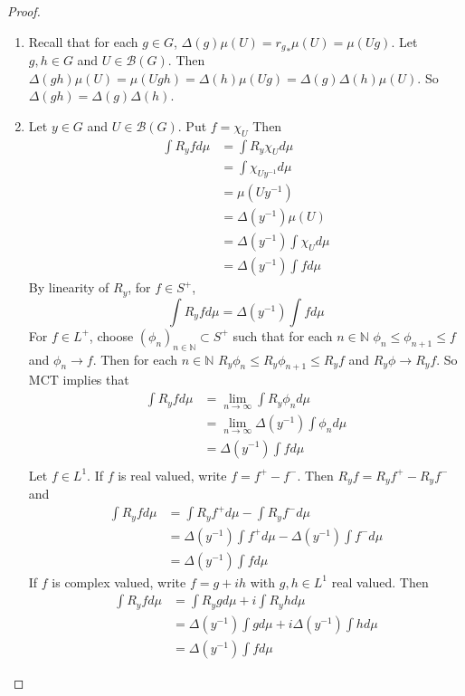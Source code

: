 \documentclass[12pt]{amsart}
\theoremstyle{definition}
\newcommand{\Del}{\Delta}
\newcommand{\N}{\mathbb{N}}
\newcommand{\MB}{\mathcal{B}}
\newcommand{\limn}{\lim \limits_{n \rightarrow \infty}}
\newcommand{\seq}[2]{(#1_{#2})_{#2 \in \N}}
\begin{document}
	\begin{proof}\
		\begin{enumerate}
			\item Recall that for each $g \in G$, $\Del(g)\mu(U) = {r_g}_*\mu(U) = \mu(Ug)$. Let $g, h \in G$ and $U \in \MB(G)$. Then $\Del(gh)\mu(U) = \mu(Ugh) = \Del(h)\mu(Ug) = \Del(g) \Del(h)\mu(U)$. So $\Del(gh) = \Del(g) \Del(h)$.
			\item Let $y \in G$ and $U \in \MB(G)$. Put $f = \chi_U$ Then 
			\begin{align*}
				\int R_y f d \mu 
				& = \int R_y \chi_U d \mu \\
				& = \int \chi_{Uy^{-1}} d \mu \\
				& = \mu(Uy^{-1}) \\
				& = \Del(y^{-1}) \mu(U) \\
				& = \Del(y^{-1})  \int \chi_U d \mu \\
				&= \Del(y^{-1})  \int f d \mu
			\end{align*}
			By linearity of $R_y$, for $f \in S^+$, $$\int R_y f d \mu = \Del(y^{-1}) \int f d \mu$$
			For $f \in L^+$, choose $\seq{\phi}{n} \subset S^+$ such that for each $n \in \N$ $\phi_n \leq \phi_{n+1} \leq f$ and $\phi_n \rightarrow f$. Then for each $n \in \N$ $R_y \phi_n \leq R_y \phi_{n+1} \leq R_y f$ and $R_y \phi \rightarrow R_y f$. So MCT implies that 
			\begin{align*}
				\int R_y f d \mu 
				& = \limn \int R_y \phi_n d \mu \\
				& = \limn \Del(y^{-1}) \int \phi_n d \mu \\
				& = \Del(y^{-1}) \int f d \mu \\
			\end{align*}
			Let $f \in L^1$. If $f$ is real valued, write $f = f^+ - f^-$. Then $R_y f = R_y f^+ - R_y f^-$ and 
			\begin{align*}
				\int R_yf d \mu 
				& = \int R_y f^+ d \mu - \int R_y f^- d \mu \\
				& = \Del(y^{-1}) \int f^+ d \mu - \Del(y^{-1}) \int f^- d \mu \\
				& = \Del(y^{-1}) \int f d \mu
			\end{align*}
			If $f$ is complex valued, write $f = g + ih$ with $g, h \in L^1$ real valued. Then 
			\begin{align*}
				\int R_yf d \mu 
				& = \int R_y g d \mu + i \int R_y h d \mu \\
				& = \Del(y^{-1}) \int g d \mu +i \Del(y^{-1}) \int h d \mu \\
				& = \Del(y^{-1}) \int f d \mu
			\end{align*}
		\end{enumerate}
	\end{proof}
\end{document}
